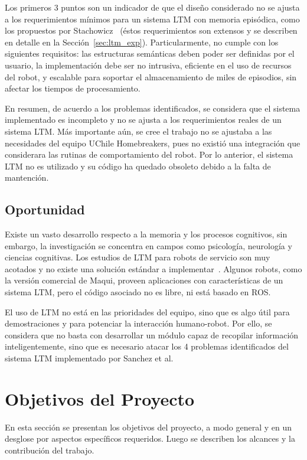 Los primeros 3 puntos son un indicador de que el diseño considerado no se ajusta a los requerimientos mínimos para un sistema LTM con memoria episódica, como los propuestos por Stachowicz~\cite{Stachowicz2012} (éstos requerimientos son extensos y se describen en detalle en la Sección~\ref{sec:ltm_exp}). Particularmente, no cumple con los siguientes requisitos: las estructuras semánticas deben poder ser definidas por el usuario, la implementación debe ser no intrusiva, eficiente en el uso de recursos del robot, y escalable para soportar el almacenamiento de miles de episodios, sin afectar los tiempos de procesamiento.

En resumen, de acuerdo a los problemas identificados, se considera que el sistema implementado es incompleto y no se ajusta a los requerimientos reales de un sistema LTM. Más importante aún, se cree el trabajo no se ajustaba a las necesidades del equipo UChile Homebreakers, pues no existió una integración que considerara las rutinas de comportamiento del robot. Por lo anterior, el sistema LTM no es utilizado y su código ha quedado obsoleto debido a la falta de mantención.

\subsection{Oportunidad}

Existe un vasto desarrollo respecto a la memoria y los procesos cognitivos, sin embargo, la investigación se concentra en campos como psicología, neurología y ciencias cognitivas. Los estudios de LTM para robots de servicio son muy acotados y no existe una solución estándar a implementar~\cite{ltm_in_robocup}. Algunos robots, como la versión comercial de Maqui, proveen aplicaciones con características de un sistema LTM, pero el código asociado no es libre, ni está basado en ROS.

El uso de LTM no está en las prioridades del equipo, sino que es algo útil para demostraciones y para potenciar la interacción humano-robot. Por ello, se considera que no basta con desarrollar un módulo capaz de recopilar información inteligentemente, sino que es necesario atacar los 4 problemas identificados del sistema LTM implementado por Sanchez et al.


\section{Objetivos del Proyecto}\label{sec:objetivos}

En esta sección se presentan los objetivos del proyecto, a modo general y en un desglose por aspectos específicos requeridos. Luego se describen los alcances y la contribución del trabajo. 

